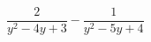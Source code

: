 \begin{ex}[type=expression]
	\begin{condition}
		\(\dfrac{2}{y^2-4y+3}-\dfrac{1}{y^2-5y+4}\)
	\end{condition}
\end{ex}